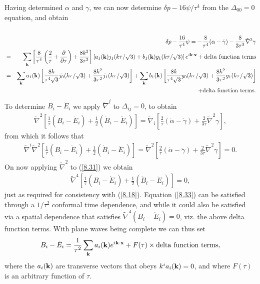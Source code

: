 \documentclass[aps,onecolumn,10pt]{revtex4}
\numberwithin{equation}{section}
\numberwithin{equation}{section}
\begin{document}
Having determined $\alpha$ and $\gamma$, we can now determine $\delta p-16\psi/\tau^4$ from the $\Delta_{00}=0$ equation, and obtain
%
\begin{eqnarray}
\nonumber\\
&&\delta p -\frac{16}{\tau^4}\psi=-\frac{8}{\tau^4}(\alpha-\dot{\gamma})-\frac{8}{3\tau^3}\tilde{\nabla}^2\gamma
\nonumber\\
&=&\sum_{\bf k}\left[\frac{8}{\tau^4}\left(\frac{2}{\tau}+\frac{\partial}{\partial \tau}\right)
+\frac{8k^2}{3\tau^3}\right]\left[a_1({\bf k})j_1(k\tau/\surd{3})+b_1({\bf k})y_1(k\tau/\surd{3})\right]e^{i{\bf k}\cdot{\bf x}} +{\rm delta~function~terms}
\nonumber\\
&=&\sum_{\bf k}a_1({\bf k})\left[\frac{8k}{\tau^4\surd{3}}j_0(k\tau/\surd{3})+\frac{8k^2}{3\tau^3}j_1(k\tau/\surd{3})\right]+\sum_{\bf k}b_1({\bf k})\left[\frac{8k}{\tau^4\surd{3}}y_0(k\tau/\surd{3})+\frac{8k^2}{3\tau^3}y_1(k\tau/\surd{3})\right]
\nonumber\\
&&+{\rm delta~function~terms}.
\label{8.30}
\end{eqnarray}
%
To determine $B_i-\dot{E}_i$ we apply $\tilde{\nabla}^j$ to $\Delta_{ij}=0$, to obtain
%
\begin{eqnarray}
\tilde{\nabla}^2\left[\frac{1}{\tau}(B_i-\dot{E}_i)+\frac{1}{2}(\dot{B}_i-\ddot{E}_i)\right]=\tilde{\nabla}_i\left[\frac{2}{\tau}(\dot{\alpha}-\ddot{\gamma})+\frac{2}{3\tau}\tilde{\nabla}^2\gamma\right],
\label{8.31}
\end{eqnarray}
%
from which it follows that
%
\begin{eqnarray}
\tilde{\nabla}^i\tilde{\nabla}^2\left[\frac{1}{\tau}(B_i-\dot{E}_i)+\frac{1}{2}(\dot{B}_i-\ddot{E}_i)\right]=\tilde{\nabla}^2\left[\frac{2}{\tau}(\dot{\alpha}-\ddot{\gamma})+\frac{2}{3\tau}\tilde{\nabla}^2\gamma\right]=0.
\label{8.32}
\end{eqnarray}
%
On now applying $\tilde{\nabla}^2$ to (\ref{8.31}) we  obtain
%
\begin{eqnarray}
\tilde{\nabla}^4\left[\frac{1}{\tau}(B_i-\dot{E}_i)+\frac{1}{2}(\dot{B}_i-\ddot{E}_i)\right]=0,
\label{8.33}
\end{eqnarray}
%
just as required for consistency with (\ref{8.18}).
Equation (\ref{8.33}) can be satisfied through a $1/\tau^2$ conformal time dependence, and while it could also be satisfied via a spatial dependence that satisfies $\tilde{\nabla}^4(B_i-\dot{E}_i)=0$, viz. the above delta function terms. With plane waves being complete we can thus set
%
\begin{eqnarray}
B_i-\dot{E}_i=\frac{1}{\tau^2}\sum_{\bf k}a_i({\bf k})e^{i{\bf k}\cdot{\bf x}}
+F(\tau)\times {\rm delta~function~terms},
\label{8.34}
\end{eqnarray}
%
where the $a_i({\bf k})$ are transverse vectors that obeys $k^ia_i({\bf k})=0$, and where $F(\tau)$ is an arbitrary function of $\tau$.
\end{document}
